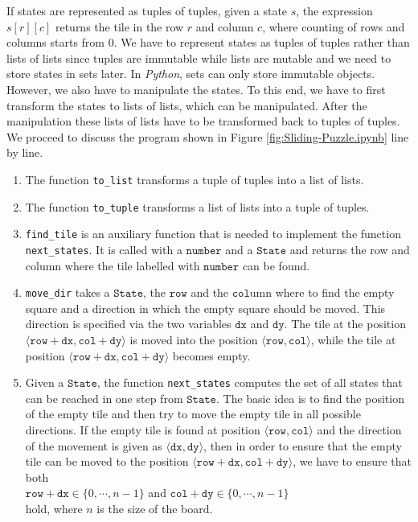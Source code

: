 If states are represented as tuples of tuples, given a state $s$, the expression $s[r][c]$ returns the tile in
the row $r$ and column $c$, where counting of rows and columns starts from $0$.
We have to represent states as tuples of tuples rather than lists of lists since
tuples are immutable while lists are mutable and we need to store states in sets later.  In \textsl{Python},
sets can only store immutable objects.  However, we also have to manipulate the states.  To this end, we have
to first transform the states to lists of lists, which can be manipulated.  After the manipulation these lists of
lists have to be transformed back to tuples of tuples.
We proceed to discuss the program shown in Figure \ref{fig:Sliding-Puzzle.ipynb} line by line.
\begin{enumerate}
\item The function \texttt{to\_list} transforms a tuple of tuples into a list of lists.
\item The function \texttt{to\_tuple} transforms a list of lists into a tuple of tuples.
\item \texttt{find\_tile} is an auxiliary function that is needed to implement the function \texttt{next\_states}.
      It is called with a $\texttt{number}$ and a $\texttt{State}$ and
      returns the row and column where the tile labelled with $\texttt{number}$ can be found.
\item \texttt{move\_dir} takes a $\texttt{State}$, the $\texttt{row}$ and the $\texttt{col}$umn
      where to find the empty square and a direction in which the empty square should be moved.
      This direction is specified via the two variables $\texttt{dx}$ and $\texttt{dy}$.  The tile
      at the position $\langle\mathtt{row} + \mathtt{dx}, \mathtt{col} + \mathtt{dy}\rangle$ is
      moved into the position $\langle\mathtt{row}, \mathtt{col}\rangle$, while the tile at position
      $\langle\mathtt{row} + \mathtt{dx}, \mathtt{col} + \mathtt{dy}\rangle$ becomes empty.
\item Given a $\texttt{State}$, the function \texttt{next\_states} computes the set of all states
      that can be reached in one step from $\texttt{State}$.  The basic idea is to find the position of the
      empty tile and then try to move the empty tile in all possible directions.  If the empty tile is found at
      position $\langle\mathtt{row}, \mathtt{col}\rangle$ and the direction of the movement is given as $\langle\mathtt{dx}, \mathtt{dy}\rangle$, then
      in order to ensure that the empty tile can be moved to the position $\langle\mathtt{row}+\mathtt{dx}, \mathtt{col}+\mathtt{dy}\rangle$,
      we have to ensure that both
      \\[0.2cm]
      \hspace*{1.3cm}
      $\mathtt{row}+\mathtt{dx} \in \{0,\cdots,n-1\}$ \quad and \quad
      $\mathtt{col}+\mathtt{dy} \in \{0,\cdots,n-1\}$
      \\[0.2cm]
      hold, where $n$ is the size of the board.
\end{enumerate}

